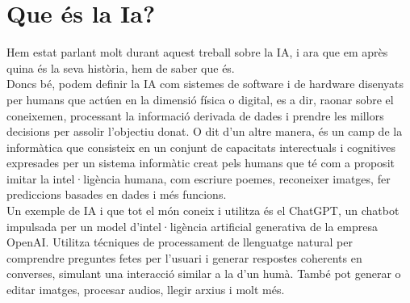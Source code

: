\section{Que és la Ia?}
Hem estat parlant molt durant aquest treball sobre la IA, i ara que em après quina és la seva història, hem de saber que és. \\
Doncs bé, podem definir la IA com sistemes de software i de hardware disenyats per humans que actúen en la dimensió física o digital, es a dir, raonar sobre el coneixemen, processant la informació derivada de dades i prendre les millors decisions per assolir l'objectiu donat. O dit d'un altre manera, és un camp de la informàtica que consisteix en un conjunt de capacitats interectuals i cognitives expresades per un sistema informàtic creat pels humans que té com a proposit imitar la intel·ligència humana, com escriure poemes, reconeixer imatges, fer prediccions basades en dades i més funcions. \\
Un exemple de IA i que tot el món coneix i utilitza és el ChatGPT, un chatbot impulsada per un model d'intel·ligència artificial generativa de la empresa OpenAI. Utilitza técniques de processament de llenguatge natural per comprendre preguntes fetes per l'usuari i generar respostes coherents en converses, simulant una interacció similar a la d'un humà. També pot generar o editar imatges, procesar audios, llegir arxius i molt més.

